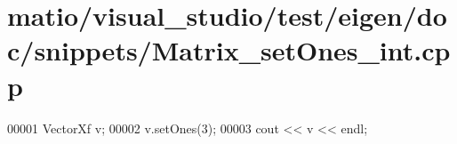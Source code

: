 \hypertarget{matio_2visual__studio_2test_2eigen_2doc_2snippets_2_matrix__set_ones__int_8cpp_source}{}\section{matio/visual\+\_\+studio/test/eigen/doc/snippets/\+Matrix\+\_\+set\+Ones\+\_\+int.cpp}
\label{matio_2visual__studio_2test_2eigen_2doc_2snippets_2_matrix__set_ones__int_8cpp_source}

\begin{DoxyCode}
00001 VectorXf v;
00002 v.setOnes(3);
00003 cout << v << endl;
\end{DoxyCode}
